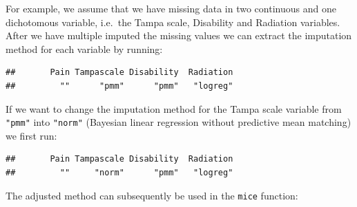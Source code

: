 \documentclass[
]{book}
\newenvironment{Shaded}{\begin{snugshade}}{\end{snugshade}}
\newcommand{\CommentTok}[1]{\textcolor[rgb]{0.56,0.35,0.01}{\textit{#1}}}
\newcommand{\DataTypeTok}[1]{\textcolor[rgb]{0.13,0.29,0.53}{#1}}
\newcommand{\DecValTok}[1]{\textcolor[rgb]{0.00,0.00,0.81}{#1}}
\newcommand{\KeywordTok}[1]{\textcolor[rgb]{0.13,0.29,0.53}{\textbf{#1}}}
\newcommand{\NormalTok}[1]{#1}
\newcommand{\OperatorTok}[1]{\textcolor[rgb]{0.81,0.36,0.00}{\textbf{#1}}}
\newcommand{\OtherTok}[1]{\textcolor[rgb]{0.56,0.35,0.01}{#1}}
\newcommand{\StringTok}[1]{\textcolor[rgb]{0.31,0.60,0.02}{#1}}
\begin{document}
For example, we assume that we have missing data in two continuous and one dichotomous variable, i.e.~the Tampa scale, Disability and Radiation variables. After we have multiple imputed the missing values we can extract the imputation method for each variable by running:

\begin{Shaded}
\end{Shaded}

\begin{verbatim}
##       Pain Tampascale Disability  Radiation 
##         ""      "pmm"      "pmm"   "logreg"
\end{verbatim}

If we want to change the imputation method for the Tampa scale variable from \texttt{"pmm"} into \texttt{"norm"} (Bayesian linear regression without predictive mean matching) we first run:

\begin{Shaded}
\end{Shaded}

\begin{verbatim}
##       Pain Tampascale Disability  Radiation 
##         ""     "norm"      "pmm"   "logreg"
\end{verbatim}

The adjusted method can subsequently be used in the \texttt{mice} function:
\end{document}
